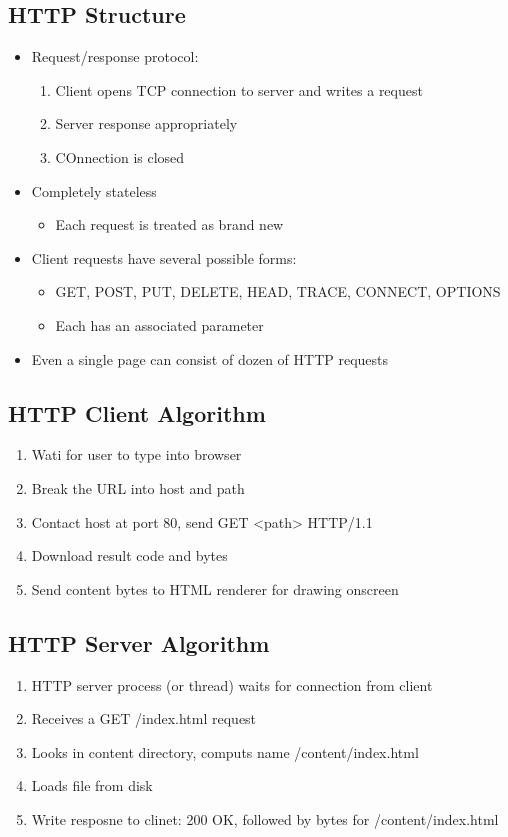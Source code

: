 \subsection{HTTP Structure}
\begin{itemize}
	\item Request/response protocol:
	\begin{enumerate}
		\item Client opens TCP connection to server and writes a request
		\item Server response appropriately
		\item COnnection is closed
	\end{enumerate}
	\item Completely stateless
	\begin{itemize}
		\item Each request is treated as brand new
	\end{itemize}
	\item Client requests have several possible forms:
	\begin{itemize}
		\item GET, POST, PUT, DELETE, HEAD, TRACE, CONNECT, OPTIONS
		\item Each has an associated parameter
	\end{itemize}
	\item Even a single page can consist of dozen of HTTP requests
\end{itemize}

\subsection{HTTP Client Algorithm}
\begin{enumerate}
	\item Wati for user to type into browser
	\item Break the URL into host and path
	\item Contact host at port 80, send GET <path> HTTP/1.1
	\item Download result code and bytes
	\item Send content bytes to HTML renderer for drawing onscreen
\end{enumerate}

\subsection{HTTP Server Algorithm}
\begin{enumerate}
	\item HTTP server process (or thread) waits for connection from client
	\item Receives a GET /index.html request
	\item Looks in content directory, computs name /content/index.html
	\item Loads file from disk
	\item Write resposne to clinet: 200 OK, followed by bytes for /content/index.html
\end{enumerate}

